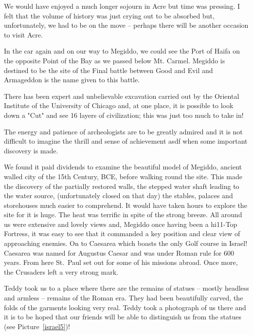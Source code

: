 We would have enjoyed a much longer sojourn in Acre but time was
pressing. I felt that the volume of history was just crying out to be
absorbed but, unfortunately, we had to be on the move -- perhaps there
will be another occasion to visit Acre.

In the car again and on our way to Megiddo, we could see the Port of
Haifa on the opposite Point of the Bay as we passed below
Mt. Carmel. Megiddo is destined to be the site of the Final battle
between Good and Evil and Armageddon is the name given to this battle.

There has been expert and unbelievable excavation carried out by the
Oriental Institute of the University of Chicago and, at one place, it
is possible to look down a "Cut" and see 16 layers of civilization;
this was just too much to take in!

The energy and patience of archeologists are to be greatly admired and
it is not difficult to imagine the thrill and sense of achievement
asdf when some important discovery is made.

We found it paid dividends to examine the beautiful model of Megiddo,
ancient walled city of the 15th Century, BCE, before walking round the
site. This made the discovery of the partially restored walls, the
stepped water shaft leading to the water source, (unfortunately closed
on that day) the stables, palaces and storehouses much easier to
comprehend. It would have taken hours to explore the site for it is
huge. The heat was terrific in spite of the strong breeze. All around
us were extensive and lovely views and, Megiddo once having been a
hi11-Top Fortress, it was easy to see that it commanded a key position
and clear view of approaching enemies. On to Caesarea which boasts the
only Golf course in Israel! Caesarea was named for Augustus Caesar and
was under Roman rule for 600 years. From here St.~Paul set out for
some of his missions abroad. Once more, the Crusaders left a very
strong mark.

Teddy took us to a place where there are the remains of statues --
mostly headless and armless -- remains of the Roman era. They had been
beautifully carved, the folds of the garments looking very real. Teddy
took a photograph of us there and it is to be hoped that our friends
will be able to distinguish us from the statues (see
Picture~\ref{israel5})!

